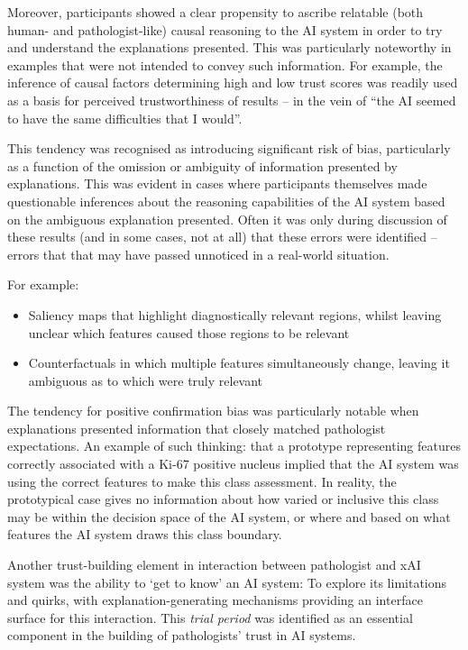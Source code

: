 Moreover, participants showed a clear propensity to ascribe relatable (both human- and pathologist-like) causal reasoning to the AI system in order to try and understand the explanations presented. This was particularly noteworthy in examples that were not intended to convey such information. For example, the inference of causal factors determining high and low trust scores was readily used as a basis for perceived trustworthiness of results -- in the vein of ``the AI seemed to have the same difficulties that I would''.

This tendency was recognised as introducing significant risk of bias, particularly as a function of the omission or ambiguity of information presented by explanations. This was evident in cases where participants themselves made questionable inferences about the reasoning capabilities of the AI system based on the ambiguous explanation presented. Often it was only during discussion of these results (and in some cases, not at all) that these errors were identified -- errors that that may have passed unnoticed in a real-world situation. 

For example:

\begin{itemize}
    \item Saliency maps that highlight diagnostically relevant regions, whilst leaving unclear which features caused those regions to be relevant
    \item Counterfactuals in which multiple features simultaneously change, leaving it ambiguous as to which were truly relevant
\end{itemize}

The tendency for positive confirmation bias was particularly notable when explanations presented information that closely matched pathologist expectations. An example of such thinking: that a prototype representing features correctly associated with a Ki-67 positive nucleus implied that the AI system was using the correct features to make this class assessment. In reality, the prototypical case gives no information about how varied or inclusive this class may be within the decision space of the AI system, or where and based on what features the AI system draws this class boundary.


Another trust-building element in interaction between pathologist and xAI system was the ability to `get to know' an AI system: To explore its limitations and quirks, with explanation-generating mechanisms providing an interface surface for this interaction. This \textit{trial period} was identified as an essential component in the building of pathologists' trust in AI systems. 

